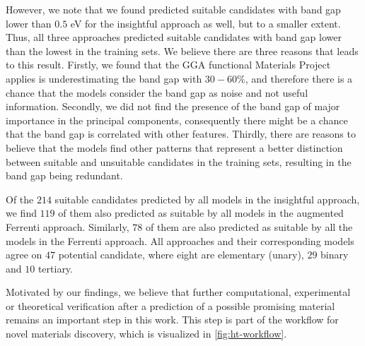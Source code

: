 However, we note that we found predicted suitable candidates with band gap lower than $0.5$ eV for the insightful approach as well, but to a smaller extent. Thus, all three approaches predicted suitable candidates with band gap lower than the lowest in the training sets. We believe there are three reasons that leads to this result. Firstly, we found that the GGA functional Materials Project applies is underestimating the band gap with $30-60\%$, and therefore there is a chance that the models consider the band gap as noise and not useful information. Secondly, we did not find the presence of the band gap of major importance in the principal components, consequently there might be a chance that the band gap is correlated with other features. Thirdly, there are reasons to believe that the models find other patterns that represent a better distinction between suitable and unsuitable candidates in the training sets, resulting in the band gap being redundant.

Of the $214$ suitable candidates predicted by all models in the insightful approach, we find $119$ of them also predicted as suitable by all models in the augmented Ferrenti approach. Similarly, $78$ of them are also predicted as suitable by all the models in the Ferrenti approach. All approaches and their corresponding models agree on $47$ potential candidate, where eight are elementary (unary), $29$ binary and $10$ tertiary.

Motivated by our findings, we believe that further computational, experimental or theoretical verification after a prediction of a possible promising material remains an important step in this work. This step is part of the workflow for novel materials discovery, which is visualized in \autoref{fig:ht-workflow}.


